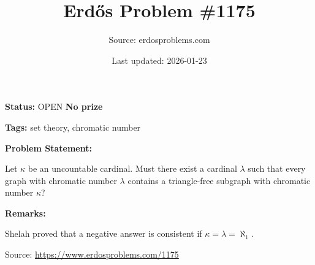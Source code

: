 \documentclass{article}
\title{Erd\H{o}s Problem \#1175}
\date{Last updated: 2026-01-23}
\author{Source: erdosproblems.com}
\begin{document}
\maketitle

\noindent\textbf{Status:} OPEN \quad \textbf{No prize}

\noindent\textbf{Tags:} set theory, chromatic number

\medskip
\noindent\textbf{Problem Statement:}

Let $\kappa$ be an uncountable cardinal. Must there exist a cardinal $\lambda$ such that every graph with chromatic number $\lambda$ contains a triangle-free subgraph with chromatic number $\kappa$?

\bigskip
\noindent\textbf{Remarks:}

Shelah proved that a negative answer is consistent if $\kappa=\lambda=\aleph_1$.

\bigskip
\noindent\small{Source: \url{https://www.erdosproblems.com/1175}}
\end{document}
